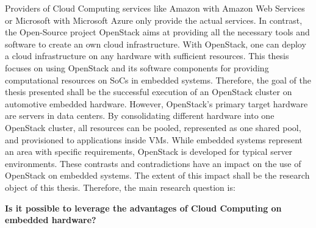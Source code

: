         \noindent Providers of Cloud Computing services like Amazon with Amazon Web Services or Microsoft with Microsoft Azure only provide the actual services.
        In contrast, the Open-Source project OpenStack \cite{OpenStack2021} aims at providing all the necessary tools and software to create an own cloud infrastructure.
        With OpenStack, one can deploy a cloud infrastructure on any hardware with sufficient resources.
        This thesis focuses on using OpenStack and its software components for providing computational resources on \acp{SoC} in embedded systems. 
        Therefore, the goal of the thesis presented shall be the successful execution of an OpenStack cluster on automotive embedded hardware.
        However, OpenStack's primary target hardware are servers in data centers.
        By consolidating different hardware into one OpenStack cluster, all resources can be pooled, represented as one shared pool, and provisioned to applications inside \acp{VM}.
        While embedded systems represent an area with specific requirements, OpenStack is developed for typical server environments.
        These contrasts and contradictions have an impact on the use of OpenStack on embedded systems.
        The extent of this impact shall be the research object of this thesis.
        Therefore, the main research question is:

        \begin{center}
            \textbf{Is it possible to leverage the advantages of Cloud Computing on embedded hardware?}
        \end{center}
        
